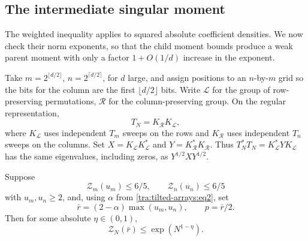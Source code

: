\subsection{The intermediate singular moment}
\label{tra:tilted-arrays:operator-split}
The weighted inequality applies to squared absolute coefficient densities. We now check their norm exponents, so that the child moment bounds produce a weak parent moment with only a factor $1+O(1/d)$ increase in the exponent.

Take \(m=2^{\lfloor d/2\rfloor}\), \(n=2^{\lceil d/2\rceil}\), for \(d\) large, and assign positions to an \(n\)-by-\(m\) grid so the bits for the column are the first \(\lfloor d/2\rfloor\) bits. Write \(\mathcal L\) for the group of row-preserving permutations, \(\mathcal R\) for the column-preserving group. On the regular representation,
\[
 T_N=K_{\mathcal R}K_{\mathcal L},
\]
where $K_{\mathcal L}$ uses independent $T_m$ sweeps on the rows and $K_{\mathcal R}$ uses independent $T_n$ sweeps on the columns. Set $X=K_{\mathcal L}K_{\mathcal L}^*$ and $Y=K_{\mathcal R}^*K_{\mathcal R}$. Thus $T_N^*T_N=K_{\mathcal L}^*YK_{\mathcal L}$ has the same eigenvalues, including zeros, as $Y^{1/2}XY^{1/2}$.
\begin{proposition}\label{tra:tilted-arrays:recursion}
\label{tra:tilted-arrays:recursion-statement}
Suppose
\[
 \mathcal Z_m(u_m)\le 6/5,\qquad \mathcal Z_n(u_n)\le 6/5
\]
with \(u_m,u_n\ge 2\), and, using \(\alpha\) from \eqref{tra:tilted-arrays:eq2}, set
\[
 \bar r=(2-\alpha)\max(u_m,u_n),\qquad p=\bar r/2 .
\]
Then for some absolute \(\eta\in(0,1)\),
\begin{equation}
 \mathcal Z_N(\bar r)\le \exp\left(N^{1-\eta}\right). \label{tra:tilted-arrays:eq6}
\end{equation}
\end{proposition}
